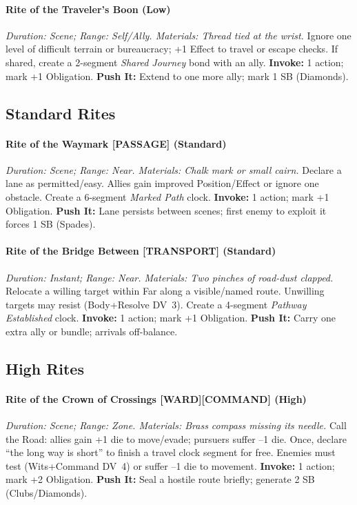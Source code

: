 \paragraph{Rite of the Traveler's Boon (Low)}  
\emph{Duration: Scene; Range: Self/Ally. Materials: Thread tied at the wrist.}  
Ignore one level of difficult terrain or bureaucracy; +1 Effect to travel or escape checks. If shared, create a 2-segment \emph{Shared Journey} bond with an ally.  
\textbf{Invoke:} 1 action; mark +1 Obligation.  
\textbf{Push It:} Extend to one more ally; mark 1 SB (Diamonds).

\subsection*{Standard Rites}
\paragraph{Rite of the Waymark [PASSAGE] (Standard)}  
\emph{Duration: Scene; Range: Near. Materials: Chalk mark or small cairn.}  
Declare a lane as permitted/easy. Allies gain improved Position/Effect or ignore one obstacle. Create a 6-segment \emph{Marked Path} clock.  
\textbf{Invoke:} 1 action; mark +1 Obligation.  
\textbf{Push It:} Lane persists between scenes; first enemy to exploit it forces 1 SB (Spades).

\paragraph{Rite of the Bridge Between [TRANSPORT] (Standard)}  
\emph{Duration: Instant; Range: Near. Materials: Two pinches of road-dust clapped.}  
Relocate a willing target within Far along a visible/named route. Unwilling targets may resist (Body+Resolve DV~3). Create a 4-segment \emph{Pathway Established} clock.  
\textbf{Invoke:} 1 action; mark +1 Obligation.  
\textbf{Push It:} Carry one extra ally or bundle; arrivals off-balance.

\subsection*{High Rites}
\paragraph{Rite of the Crown of Crossings [WARD][COMMAND] (High)}  
\emph{Duration: Scene; Range: Zone. Materials: Brass compass missing its needle.}  
Call the Road: allies gain +1 die to move/evade; pursuers suffer --1 die. Once, declare ``the long way is short'' to finish a travel clock segment for free. Enemies must test (Wits+Command DV~4) or suffer --1 die to movement.  
\textbf{Invoke:} 1 action; mark +2 Obligation.  
\textbf{Push It:} Seal a hostile route briefly; generate 2 SB (Clubs/Diamonds).

